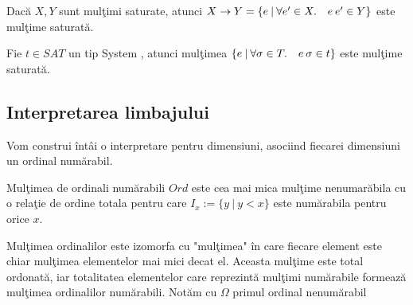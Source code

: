 \done{}
\begin{lemma}
Dac\u a $X,Y$ sunt mul\c timi saturate, atunci $X \to Y = \{ e \: |\: \forall e' \in X.\quad e\hspace{2pt} e' \in Y \} $ este mul\c time saturat\u a.
\end{lemma}
\begin{comment}
\begin{proof}[Demonstratie]
Se observa ca orice expresie $e \in X \to Y$ este reductibil\u a:
\begin{equation}
\forall e'.\quad e\app e' \in Y \Rightarrow e\app e' \in SN \Rightarrow e \in SN
\end{equation}
In continuare vom demonstra ca $B \subset X \to Y$. Fie $e \in B$ si $e' \in X $. Din faptul ca $e' \in X \subset SN$, rezulta ca $[]\app e'$ este un context slab, deci $e\app e' \in B \subset Y$. Deci $e \in X \to Y$.

Fie $e \in SN$ cu $e \to_k e'$ si $e' \in X \to Y$. Consideram o expresie $t \in X \subset SN$ arbitrara . Cum contextul $ []\app t $ este context slab, avem ca $e\app t \to_k e'\app t$. Cum $t\in SN$ avem $e'\app t \in Y \subset SN$. Din lema urmatoare \todo{e t in SN} rezulta ca $e \app t \in SN$ si cum $e \app t \to_k e' \app t \in Y$ inseamna ca $Y$ indeplineste si cea de-a treia conditie pentru multimi saturate.
\end{proof}
\end{comment}

\begin{lemma}
Fie $t \in SAT$ un tip System \fhat, atunci mul\c timea $\{ e \: |\: \forall \sigma \in T .\quad e\hspace{2pt} \sigma \in t\}$ este mul\c time saturat\u a.
\end{lemma}

\subsection{Interpretarea limbajului}

Vom construi \^ int\^ ai o interpretare pentru dimensiuni, asociind fiecarei dimensiuni un ordinal num\u arabil.

\begin{definition}
Mul\c timea de ordinali num\u arabili $Ord$ este cea mai mica mul\c time nenumar\u abila cu o rela\c tie de ordine totala  pentru care $I_x := \{ y \: |\: y < x \}$ este num\u arabila pentru orice $x$.
\end{definition}

\begin{remark}
Mul\c timea ordinalilor este izomorfa cu "mul\c timea" \^ in care fiecare element este chiar mul\c timea elementelor mai mici decat el. Aceasta mul\c time este total ordonat\u a, iar totalitatea elementelor care reprezint\u a mul\c timi num\u arabile formeaz\u a mul\c timea ordinalilor num\u arabili. Not\u am cu $\Omega$ primul ordinal nenum\u arabil
\end{remark}


